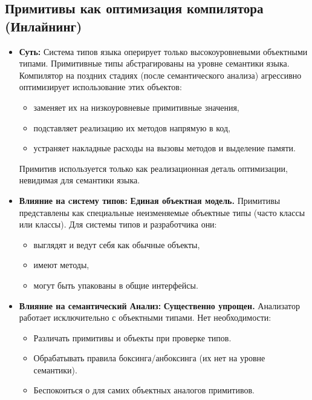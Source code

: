 \subsection{Примитивы как оптимизация компилятора (Инлайнинг)}

\begin{itemize}[label={--}, leftmargin=*]
    \item \textbf{Суть:} Система типов языка оперирует только высокоуровневыми объектными типами. Примитивные типы абстрагированы на уровне семантики языка. Компилятор на поздних стадиях (после семантического анализа) агрессивно оптимизирует использование этих объектов:
    \begin{itemize}[label={--}]
        \item заменяет их на низкоуровневые примитивные значения,
        \item подставляет реализацию их методов напрямую в код,
        \item устраняет накладные расходы на вызовы методов и выделение памяти.
    \end{itemize}
    Примитив используется только как реализационная деталь оптимизации, невидимая для семантики языка.

    \item \textbf{Влияние на cистему типов:} \textbf{Единая объектная модель.} Примитивы представлены как специальные неизменяемые объектные типы (часто  классы или  классы). Для системы типов и разработчика они:
    \begin{itemize}[label={--}]
        \item выглядят и ведут себя как обычные объекты,
        \item имеют методы,
        \item могут быть упакованы в общие интерфейсы.
    \end{itemize}

    \item \textbf{Влияние на семантический Анализ:} \textbf{Существенно упрощен.} Анализатор работает исключительно с объектными типами. Нет необходимости:
    \begin{itemize}[label={--}]
        \item Различать примитивы и объекты при проверке типов.
        \item Обрабатывать правила боксинга/анбоксинга (их нет на уровне семантики).
        \item Беспокоиться о  для самих объектных аналогов примитивов.
    \end{itemize}


\end{itemize}
